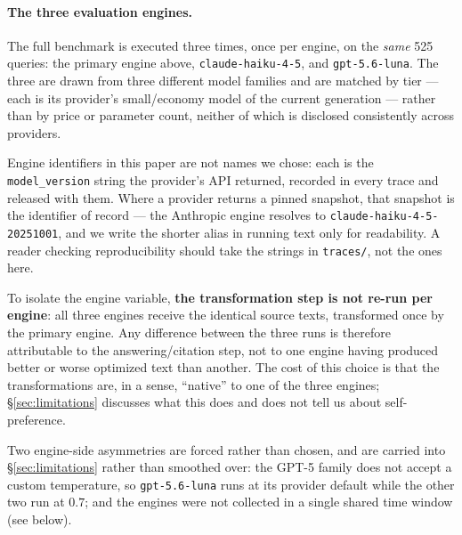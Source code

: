 \documentclass[11pt,a4paper]{article}
\begin{document}
\paragraph{The three evaluation engines.} The full benchmark is executed
three times, once per engine, on the \emph{same} 525 queries: the primary
engine above, \texttt{claude-haiku-4-5}, and \texttt{gpt-5.6-luna}. The
three are drawn from three different model families and are matched by
tier --- each is its provider's small/economy model of the current
generation --- rather than by price or parameter count, neither of which is
disclosed consistently across providers.

Engine identifiers in this paper are not names we chose: each is the
\texttt{model\_version} string the provider's API returned, recorded in
every trace and released with them. Where a provider returns a pinned
snapshot, that snapshot is the identifier of record --- the Anthropic engine
resolves to \texttt{claude-haiku-4-5-20251001}, and we write the shorter
alias in running text only for readability. A reader checking
reproducibility should take the strings in \texttt{traces/}, not the ones
here.

To isolate the engine variable, \textbf{the transformation step is not
re-run per engine}: all three engines receive the identical source texts,
transformed once by the primary engine. Any difference between the three
runs is therefore attributable to the answering/citation step, not to one
engine having produced better or worse optimized text than another. The
cost of this choice is that the transformations are, in a sense, ``native''
to one of the three engines; \S\ref{sec:limitations} discusses what this
does and does not tell us about self-preference.

Two engine-side asymmetries are forced rather than chosen, and are carried
into \S\ref{sec:limitations} rather than smoothed over: the GPT-5 family
does not accept a custom temperature, so \texttt{gpt-5.6-luna} runs at its
provider default while the other two run at $0.7$; and the engines were not
collected in a single shared time window (see below).
\end{document}
